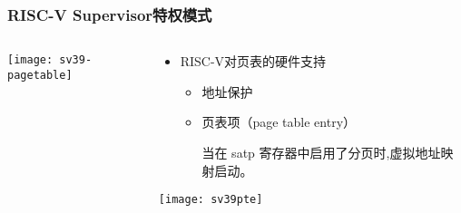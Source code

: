 \begin{frame}   
	\frametitle{RISC-V Supervisor特权模式}
	
	\begin{columns}[t]
		
		\begin{column}{.5\textwidth}
			
			\texttt{[image: sv39-pagetable]}
			
		\end{column}
		
		
		\begin{column}{.5\textwidth}
			
			\begin{itemize}\large
				\item RISC-V对页表的硬件支持
				\begin{itemize}
					\item 地址保护
					\item 页表项（page table entry）
					
					当在 satp 寄存器中启用了分页时,虚拟地址映射启动。
				\end{itemize}
			\end{itemize}
			\texttt{[image: sv39pte]}

		\end{column}
		
		
	\end{columns}
	
\end{frame}




